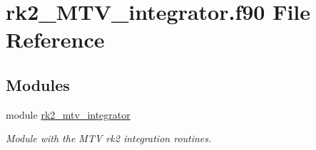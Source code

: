 \hypertarget{rk2__MTV__integrator_8f90}{}\section{rk2\+\_\+\+M\+T\+V\+\_\+integrator.\+f90 File Reference}
\label{rk2__MTV__integrator_8f90}
\subsection*{Modules}
\begin{DoxyCompactItemize}
\item 
module \hyperlink{namespacerk2__mtv__integrator}{rk2\+\_\+mtv\+\_\+integrator}
\begin{DoxyCompactList}\small\item\em Module with the M\+TV rk2 integration routines. \end{DoxyCompactList}\end{DoxyCompactItemize}
